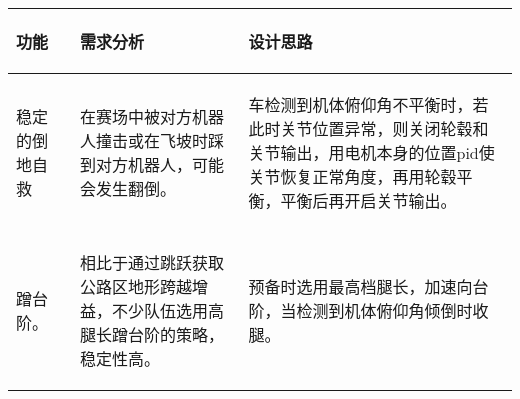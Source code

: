 
\begin{longtable}{ p{2cm} | p{7.8cm} | p{6cm} |}

    \hline

    \endfoot
    
    \rowcolor{tabhdcolor}

        \begin{center}
            功能
        \end{center} &
        \begin{center}
            需求分析
        \end{center} &
        \begin{center}
            设计思路
        \end{center} \\

    \hline

    \endhead

        \begin{center}
            稳定的倒地自救
        \end{center} &
        \begin{center}
            在赛场中被对方机器人撞击或在飞坡时踩到对方机器人，可能会发生翻倒。
        \end{center} &
        \begin{center}
            车检测到机体俯仰角不平衡时，若此时关节位置异常，则关闭轮毂和关节输出，用电机本身的位置pid使关节恢复正常角度，再用轮毂平衡，平衡后再开启关节输出。
        \end{center} \\
        
    \hline

        \begin{center}
            蹭台阶。
        \end{center} &
        \begin{center}
            相比于通过跳跃获取公路区地形跨越增益，不少队伍选用高腿长蹭台阶的策略，稳定性高。
        \end{center} &
        \begin{center}
            预备时选用最高档腿长，加速向台阶，当检测到机体俯仰角倾倒时收腿。
        \end{center} \\
        

\end{longtable}
